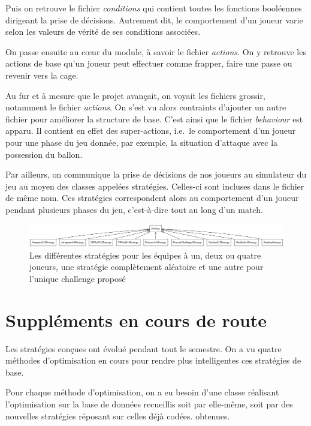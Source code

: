 \documentclass[12pt,a4paper]{article}
\begin{document}
Puis on retrouve le fichier {\itshape conditions} qui contient toutes les 
fonctions bool\'eennes dirigeant la prise de d\'ecisions. Autrement dit, le 
comportement d'un joueur varie selon les valeurs de v\'erit\'e de ses 
conditions associ\'ees.

On passe ensuite au c\oe ur du module, \`a savoir le fichier {\itshape 
actions}. On y retrouve les actions de base qu'un joueur peut effectuer comme 
frapper, faire une passe ou revenir vers la cage.

Au fur et \`a mesure que le projet avan\c{c}ait, on voyait les fichiers 
grossir, notamment le fichier {\itshape actions}. On s'est vu alors contraints 
d'ajouter un autre fichier pour am\'eliorer la structure de base. C'est ainsi 
que le fichier {\itshape behaviour} est apparu. Il contient en effet des 
super-actions, i.e.\ le comportement d'un joueur pour une phase du jeu 
donn\'ee, par exemple, la situation d'attaque avec la possession du ballon.

Par ailleurs, on communique la prise de d\'ecisions de nos joueurs au 
simulateur du jeu au moyen des classes appel\'ees strat\'egies. Celles-ci sont 
incluses dans le fichier de m\^eme nom. Ces strat\'egies correspondent alors au 
comportement d'un joueur pendant plusieurs phases du jeu, c'est-\`a-dire tout 
au long d'un match.

\begin{figure}[!h]
  \centering
  \captionsetup{justification=centering}
  \includegraphics[width=1.\textwidth]{baseStrategies}
  \caption[Les strat\'egies de base]{Les diff\'erentes strat\'egies pour les 
\'equipes \`a un, deux ou quatre joueurs, une strat\'egie compl\`etement 
al\'eatoire et une autre pour l'unique challenge propos\'e}
  \label{fig:strats}
\end{figure}

\section{Suppl\'ements en cours de route}
Les strat\'egies con\c{c}ues ont \'evolu\'e pendant tout le semestre. On a vu 
quatre m\'ethodes d'optimisation en cours pour rendre plus intelligentes 
ces strat\'egies de base.

Pour chaque m\'ethode d'optimisation, on a eu besoin d'une classe r\'ealisant 
l'optimisation sur la base de donn\'ees recueillis soit par elle-m\^eme, soit 
par des nouvelles strat\'egies r\'eposant sur celles d\'ej\`a cod\'ees.
obtenues.
\end{document}
